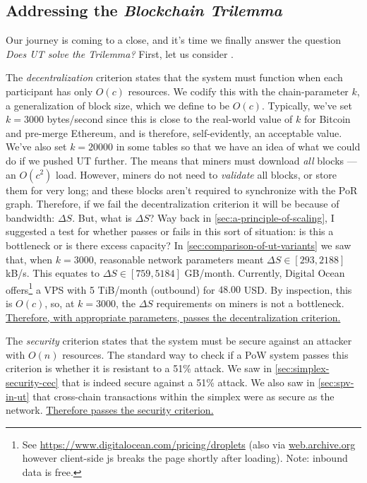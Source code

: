 \subsection{Addressing the \emph{Blockchain Trilemma}}

Our journey is coming to a close, and it's time we finally answer the question \emph{Does UT solve the Trilemma?}
First, let us consider .

The \emph{decentralization} criterion states that the system must function when each participant has only $O(c)$ resources.
We codify this with the chain-parameter $k$, a generalization of block size, which we define to be $O(c)$.
Typically, we've set $k = 3000$ bytes/second since this is close to the real-world value of $k$ for Bitcoin and pre-merge Ethereum, and is therefore, self-evidently, an acceptable value.
We've also set $k = 20000$ in some tables so that we have an idea of what we could do if we pushed UT further.
The \AxiomOfAvailability means that miners must download \emph{all} blocks --- an $O(c^2)$ load.
However, miners do not need to \emph{validate} all blocks, or store them for very long; and these blocks aren't required to synchronize with the PoR graph.
Therefore, if we fail the decentralization criterion it will be because of bandwidth: $\Delta S$.
But, what is $\Delta S$?
Way back in \autoref{sec:a-principle-of-scaling}, I suggested a test for whether  passes or fails in this sort of situation: is this a bottleneck or is there excess capacity?
In \autoref{sec:comparison-of-ut-variants} we saw that, when $k = 3000$, reasonable network parameters meant $\Delta S \in [293, 2188]$ kB/s.
This equates to $\Delta S \in [759, 5184]$ GB/month.
Currently, Digital Ocean offers\footnote{
    See \href{https://www.digitalocean.com/pricing/droplets}{https://www.digitalocean.com/pricing/droplets} (also via \href{https://web.archive.org/web/20250126134024/https://www.digitalocean.com/pricing/droplets}{web.archive.org} however client-side js breaks the page shortly after loading).
    Note: inbound data is free.
} a VPS with 5 TiB/month (outbound) for $48.00$ USD.
By inspection, this is $O(c)$, so, at $k = 3000$, the $\Delta S$ requirements on miners is not a bottleneck.
\ul{Therefore, with appropriate parameters,  passes the decentralization criterion.}


The \emph{security} criterion states that the system must be secure against an attacker with $O(n)$ resources.
The standard way to check if a PoW system passes this criterion is whether it is resistant to a 51\% attack.
We saw in \autoref{sec:simplex-security-cec} that  is indeed secure against a 51\% attack.
We also saw in \autoref{sec:spv-in-ut} that cross-chain transactions within the simplex were as secure as the network.
\ul{Therefore  passes the security criterion.}


